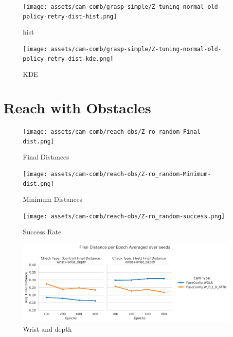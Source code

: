   \begin{figure}[H]
    \centering
    \texttt{[image: assets/cam-comb/grasp-simple/Z-tuning-normal-old-policy-retry-dist-hist.png]}
    \caption{hist}
  \end{figure}

  \begin{figure}[H]
    \centering
    \texttt{[image: assets/cam-comb/grasp-simple/Z-tuning-normal-old-policy-retry-dist-kde.png]}
    \caption{KDE}
  \end{figure}




\section{Reach with Obstacles}
  \begin{figure}[H]
    \centering
    \texttt{[image: assets/cam-comb/reach-obs/Z-ro\_random-Final-dist.png]}
    \caption{Final Distances}
  \end{figure}

  \begin{figure}[H]
    \centering
    \texttt{[image: assets/cam-comb/reach-obs/Z-ro\_random-Minimum-dist.png]}
    \caption{Minimum Distances}
  \end{figure}

  \begin{figure}[H]
    \centering
    \texttt{[image: assets/cam-comb/reach-obs/Z-ro\_random-success.png]}
    \caption{Success Rate}
  \end{figure}

  \begin{figure}[H]
  \centering
  \includegraphics[width=0.7\linewidth]{assets/evaluation/derivatives/grasp-normal-wd.png}
  \caption{Wrist and depth}\label{fig:deriv-normal-final-wd}
\end{figure}

